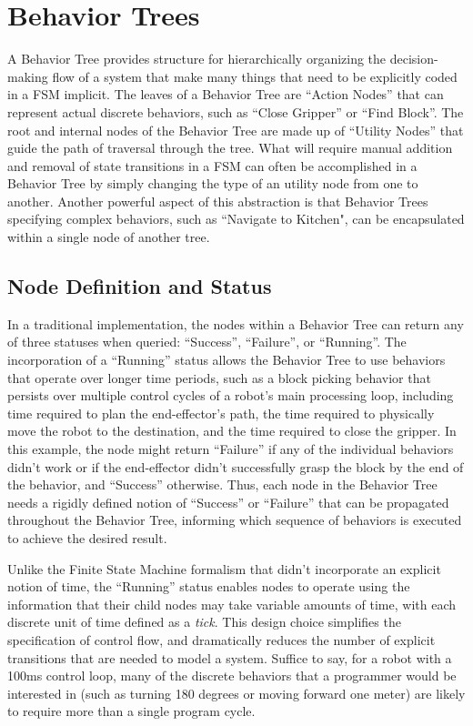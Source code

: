 \section{Behavior Trees}\label{sec:behaviortrees}
A Behavior Tree \cite{colledanchise2018behavior} provides structure for hierarchically organizing the decision-making flow of a system that make many things that need to be explicitly coded in a FSM implicit. The leaves of a Behavior Tree are ``Action Nodes'' that can represent actual discrete behaviors, such as ``Close Gripper'' or ``Find Block''. The root and internal nodes of the Behavior Tree are made up of ``Utility Nodes'' that guide the path of traversal through the tree. What will require manual addition and removal of state transitions in a FSM can often be accomplished in a Behavior Tree by simply changing the type of an utility node from one to another. Another powerful aspect of this abstraction is that Behavior Trees specifying complex behaviors, such as ``Navigate to Kitchen", can be encapsulated within a single node of another tree.

\subsection{Node Definition and Status}
In a traditional implementation, the nodes within a Behavior Tree can return any of three statuses when queried: ``Success'', ``Failure'', or ``Running''. The incorporation of a ``Running'' status allows the Behavior Tree to use behaviors that operate over longer time periods, such as a block picking behavior that persists over multiple control cycles of a robot's main processing loop, including time required to plan the end-effector's path, the time required to physically move the robot to the destination, and the time required to close the gripper. In this example, the node might return ``Failure'' if any of the individual behaviors didn't work or if the end-effector didn't successfully grasp the block by the end of the behavior, and ``Success'' otherwise. Thus, each node in the Behavior Tree needs a rigidly defined notion of ``Success'' or ``Failure'' that can be propagated throughout the Behavior Tree, informing which sequence of behaviors is executed to achieve the desired result.

Unlike the Finite State Machine formalism that didn't incorporate an explicit notion of time, the ``Running'' status enables nodes to operate using the information that their child nodes may take variable amounts of time, with each discrete unit of time defined as a \emph{tick}. This design choice simplifies the specification of control flow, and dramatically reduces the number of explicit transitions that are needed to model a system. Suffice to say, for a robot with a 100ms control loop, many of the discrete behaviors that a programmer would be interested in (such as turning 180 degrees or moving forward one meter) are likely to require more than a single program cycle.

